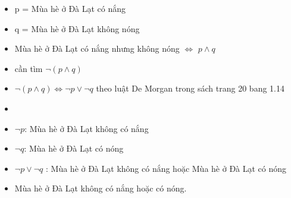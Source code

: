 \documentclass{article}
\begin{document}
\begin{enumerate}
\begin{itemize}
        \item p = Mùa hè ở Đà Lạt có nắng
        \item q = Mùa hè ở Đà Lạt không nóng
        \item Mùa hè ở Đà Lạt có nắng nhưng không nóng $\Longleftrightarrow$ $p \wedge q$
        \item cần tìm $\neg(p \wedge q)$
        \item $\neg(p \wedge q) \Longleftrightarrow \neg p \vee \neg q$ theo luật De Morgan trong sách trang 20 bang 1.14
        \item \item $\neg p$: Mùa hè ở Đà Lạt không có nắng
        \item $\neg q$: Mùa hè ở Đà Lạt có nóng
        \item $\neg p \vee \neg q$ : Mùa hè ở Đà Lạt không có nắng hoặc Mùa hè ở Đà Lạt có nóng
        \item  Mùa hè ở Đà Lạt không có nắng hoặc có nóng.
    \end{itemize}
\end{enumerate}
\end{document}
